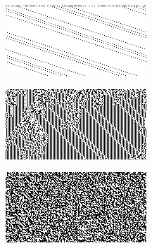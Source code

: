 \begin{figure}[htbp]
\begin{subfigure}[b]{.03\linewidth}
    \caption*{}
   \label{fig:simple}
  \end{subfigure}
  \begin{subfigure}[b]{.31\linewidth}
    \centering
    \includegraphics[width=\linewidth]{figures/three_simple_eca.png}
    \caption{}
   \label{fig:simple}
  \end{subfigure}
  \begin{subfigure}[b]{.31\linewidth}
    \centering
    \includegraphics[width=\linewidth]{figures/three_complex_eca.png}
    \caption{}
   \label{fig:complex}
  \end{subfigure}
  \begin{subfigure}[b]{.31\linewidth}
    \centering
    \includegraphics[width=\linewidth]{figures/three_random_eca.png}

\end{subfigure}
\end{figure}
